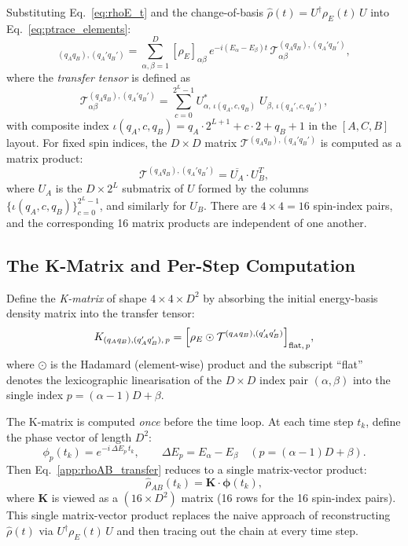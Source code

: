 \documentclass[12pt,a4paper]{article}
\newcommand{\rhohat}{\hat{\rho}}
\begin{document}
Substituting Eq.~\eqref{eq:rhoE_t} and the change-of-basis
$\rhohat(t) = U^\dagger\rho_E(t)\,U$ into Eq.~\eqref{eq:ptrace_elements}:
\begin{equation}
  [\rhohat_{AB}(t)]_{(q_Aq_B),(q_A'q_B')}
  = \sum_{\alpha,\beta=1}^D [\rho_E]_{\alpha\beta}\,
    e^{-i(E_\alpha-E_\beta)t}\,
    \mathcal{T}_{\alpha\beta}^{(q_Aq_B),(q_A'q_B')},
  \label{app:rhoAB_transfer}
\end{equation}
where the \emph{transfer tensor} is defined as
\begin{equation}
  \mathcal{T}_{\alpha\beta}^{(q_Aq_B),(q_A'q_B')}
  = \sum_{c=0}^{2^L-1}
    U^*_{\alpha,\,\iota(q_A,c,q_B)}\;
    U_{\beta,\,\iota(q_A',c,q_B')},
  \label{app:Ttensor}
\end{equation}
with composite index $\iota(q_A,c,q_B) = q_A\cdot 2^{L+1}+c\cdot 2+q_B+1$
in the $[A,C,B]$ layout.  For fixed spin indices, the $D\times D$ matrix
$\mathcal{T}^{(q_Aq_B),(q_A'q_B')}$ is computed as a matrix product:
\begin{equation}
  \mathcal{T}^{(q_Aq_B),(q_A'q_B')} = \overline{U_A}\cdot U_B^T,
  \label{app:T_BLAS}
\end{equation}
where $U_A$ is the $D\times2^L$ submatrix of $U$ formed by the columns
$\{\iota(q_A,c,q_B)\}_{c=0}^{2^L-1}$, and similarly for $U_B$.  There are
$4\times4=16$ spin-index pairs, and the corresponding 16 matrix products are
independent of one another.

\subsection{The K-Matrix and Per-Step Computation}
\label{app:kmatrix}

Define the \emph{K-matrix} of shape $4\times4\times D^2$ by absorbing the
initial energy-basis density matrix into the transfer tensor:
\begin{equation}
  K_{(q_Aq_B),(q_A'q_B'),\,p}
  = \Bigl[\rho_E \odot \mathcal{T}^{(q_Aq_B),(q_A'q_B')}\Bigr]_{\mathrm{flat},\,p},
  \label{app:K}
\end{equation}
where $\odot$ is the Hadamard (element-wise) product and the subscript ``flat''
denotes the lexicographic linearisation of the $D\times D$ index pair
$(\alpha,\beta)$ into the single index $p=(\alpha-1)D+\beta$.

The K-matrix is computed \emph{once} before the time loop.  At each time step
$t_k$, define the phase vector of length $D^2$:
\begin{equation}
  \phi_p(t_k) = e^{-i\,\Delta E_p\,t_k},
  \qquad \Delta E_p = E_\alpha - E_\beta \quad (p = (\alpha-1)D+\beta).
  \label{app:phase}
\end{equation}
Then Eq.~\eqref{app:rhoAB_transfer} reduces to a single matrix-vector product:
\begin{equation}
  \boxed{
    \hat{\rho}_{AB}(t_k) = \mathbf{K}\cdot\boldsymbol{\phi}(t_k),
  }
  \label{app:per_step}
\end{equation}
where $\mathbf{K}$ is viewed as a $(16\times D^2)$ matrix (16 rows for the 16
spin-index pairs).  This single matrix-vector product replaces the naive
approach of reconstructing $\rhohat(t)$ via $U^\dagger\rho_E(t)\,U$ and then
tracing out the chain at every time step.
\end{document}
